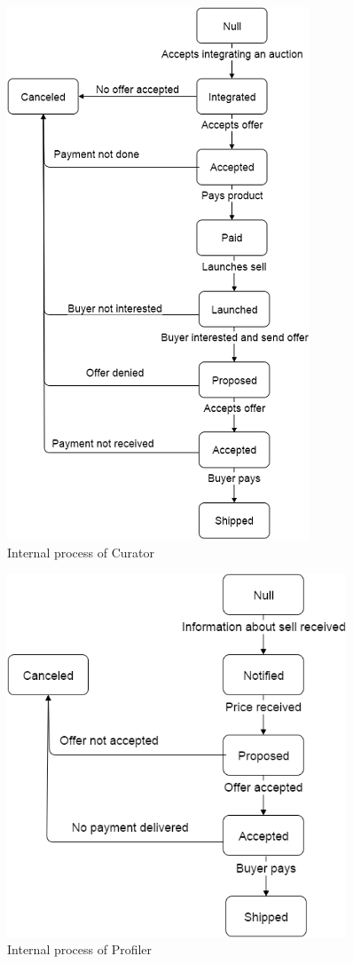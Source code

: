 \documentclass[a4paper,11pt]{report}
\begin{document}
   \begin{figure}[ht!]
    \centering
    \includegraphics[height=0.9\textheight]{media/statechart_curator.png}
    \caption{Internal process of Curator}
    \label{figure:statechartCurator}
   \end{figure}

   \begin{figure}[ht!]
    \centering
    \includegraphics[width=0.9\textwidth]{media/statechart_profiler.png}
    \caption{Internal process of Profiler}
    \label{figure:statechartProfiler}
   \end{figure}
   
\end{document}

